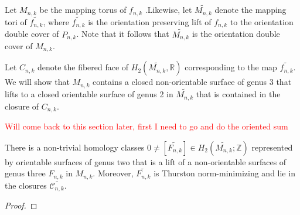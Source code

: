 Let $M_{n,k}$ be the mapping torus of $f_{n,k}$ .Likewise, let $\widetilde{M_{n,k}}$ denote the mapping tori of $\widetilde{f_{n,k}}$, where $\widetilde{f_{n,k}}$ is the orientation preserving lift of $f_{n,k}$ to the orientation double cover of $P_{n,k}$. Note that it follows that $\widetilde{M_{n,k}}$ is the orientation double cover of $M_{n,k}$.

Let $C_{n,k}$ denote the fibered face of $H_2(\widetilde{M_{n,k}},\mathbb{R})$ corresponding to the map $\widetilde{f_{n,k}}$. We will show that $M_{n,k}$ contains a closed non-orientable surface of genus 3 that lifts to a closed orientable surface of genus 2 in $\widetilde{M_{n,k}}$ that is contained in the closure of $C_{n,k}$.

\textcolor{red}{Will come back to this section later, first I need to go and do the oriented sum}

\begin{lem}
There is a non-trivial homology classes $0 \neq [\widetilde{F_{n,k}}] \in H_2(\widetilde{M_{n,k}};\mathbb{Z})$ represented by orientable surfaces of genus two that is a lift of a non-orientable surfaces of genus three $F_{n,k}$ in $M_{n,k}$. Moreover, $\widetilde{F_{n,k}}$ is Thurston norm-minimizing and lie in the closures $\overline{\mathcal{C}_{n,k}}$.
\end{lem}
\begin{proof}

\end{proof}

